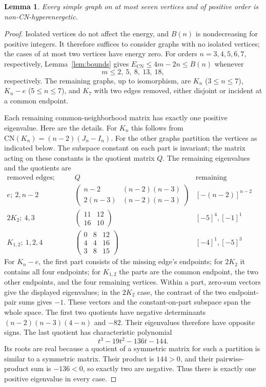 \documentclass[11pt]{article}
\newtheorem{lemma}[theorem]{Lemma}
\newcommand{\ECN}{E_{\mathrm{CN}}}
\newcommand{\CN}{\mathrm{CN}}
\begin{document}
\begin{lemma}\label{lem:small}
Every simple graph on at most seven vertices and of positive order is
non-CN-hyperenergetic.
\end{lemma}
\begin{proof}
Isolated vertices do not affect the energy, and $B(n)$ is nondecreasing
for positive integers. It therefore suffices to consider graphs with no
isolated vertices; the cases of at most two vertices have energy zero.
For orders $n=3,4,5,6,7$, respectively, Lemma~\ref{lem:bounds} gives
$\ECN\le4m-2n\le B(n)$ whenever
\[
 m\le2,\ 5,\ 8,\ 13,\ 18,
\]
respectively. The remaining graphs, up to isomorphism, are $K_n$
($3\le n\le7$), $K_n-e$ ($5\le n\le7$), and $K_7$ with two edges
removed, either disjoint or incident at a common endpoint.

Each remaining common-neighborhood matrix has exactly one positive
eigenvalue. Here are the details. For $K_n$ this follows from
$\CN(K_n)=(n-2)(J_n-I_n)$. For the other graphs partition the vertices
as indicated below. The subspace constant on each part is invariant;
the matrix acting on these constants is the quotient matrix $Q$.
The remaining eigenvalues and the quotients are
\[
\begin{array}{c|c|c}
\text{removed edges; part sizes}&Q&\text{remaining eigenvalues}\\ \hline
e;\ 2,n-2 &
\begin{pmatrix}n-2&(n-2)(n-3)\\2(n-3)&(n-2)(n-3)\end{pmatrix}
&[-(n-2)]^{n-2}\\[8pt]
2K_2;\ 4,3&\begin{pmatrix}11&12\\16&10\end{pmatrix}&[-5]^4,[-1]^1\\[8pt]
K_{1,2};\ 1,2,4&\begin{pmatrix}0&8&12\\4&4&16\\3&8&15\end{pmatrix}
&[-4]^1,[-5]^3
\end{array}
\]
For $K_n-e$, the first part consists of the missing edge's endpoints;
for $2K_2$ it contains all four endpoints; for $K_{1,2}$ the parts are
the common endpoint, the two other endpoints, and the four remaining
vertices. Within a part, zero-sum vectors give the displayed eigenvalues;
in the $2K_2$ case, the contrast of the two endpoint-pair sums gives $-1$.
These vectors and the constant-on-part subspace span the whole space.
The first two quotients have negative determinants
$(n-2)(n-3)(4-n)$ and $-82$. Their eigenvalues therefore have opposite
signs. The last quotient has characteristic polynomial
\[
 t^3-19t^2-136t-144.
\]
Its roots are real because a quotient of a symmetric matrix for such a
partition is similar to a symmetric matrix. Their product is $144>0$,
and their pairwise-product sum is $-136<0$, so exactly two are negative.
Thus there is exactly one positive eigenvalue in every case.


\end{proof}
\end{document}
